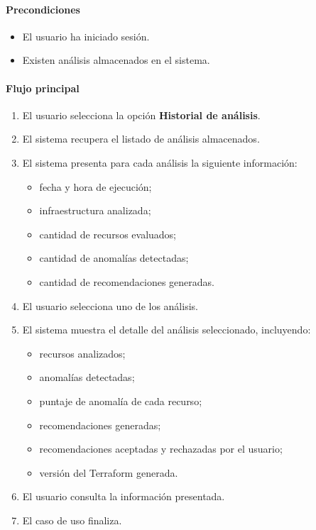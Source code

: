 \paragraph*{Precondiciones}

\begin{itemize}
\item El usuario ha iniciado sesión.
\item Existen análisis almacenados en el sistema.
\end{itemize}

\paragraph*{Flujo principal}

\begin{enumerate}
\item El usuario selecciona la opción \textbf{Historial de análisis}.
\item El sistema recupera el listado de análisis almacenados.
\item El sistema presenta para cada análisis la siguiente información:
  \begin{itemize}
  \item fecha y hora de ejecución;
  \item infraestructura analizada;
  \item cantidad de recursos evaluados;
  \item cantidad de anomalías detectadas;
  \item cantidad de recomendaciones generadas.
  \end{itemize}
\item El usuario selecciona uno de los análisis.
\item El sistema muestra el detalle del análisis seleccionado, incluyendo:
  \begin{itemize}
  \item recursos analizados;
  \item anomalías detectadas;
  \item puntaje de anomalía de cada recurso;
  \item recomendaciones generadas;
  \item recomendaciones aceptadas y rechazadas por el usuario;
  \item versión del Terraform generada.
  \end{itemize}
\item El usuario consulta la información presentada.
\item El caso de uso finaliza.
\end{enumerate}

